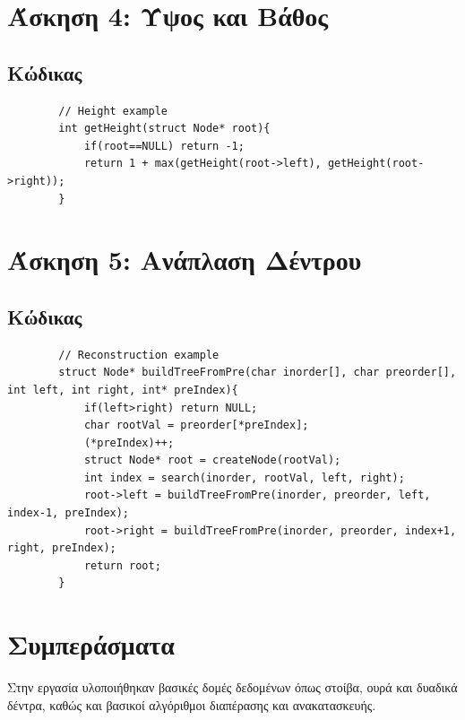 \documentclass[a4paper,12pt]{article}
\begin{document}
	\section{Άσκηση 4: Ύψος και Βάθος}
	
	\subsection{Κώδικας}
	\begin{lstlisting}
		// Height example
		int getHeight(struct Node* root){
			if(root==NULL) return -1;
			return 1 + max(getHeight(root->left), getHeight(root->right));
		}
	\end{lstlisting}
	
	\section{Άσκηση 5: Ανάπλαση Δέντρου}
	
	\subsection{Κώδικας}
	\begin{lstlisting}
		// Reconstruction example
		struct Node* buildTreeFromPre(char inorder[], char preorder[], int left, int right, int* preIndex){
			if(left>right) return NULL;
			char rootVal = preorder[*preIndex];
			(*preIndex)++;
			struct Node* root = createNode(rootVal);
			int index = search(inorder, rootVal, left, right);
			root->left = buildTreeFromPre(inorder, preorder, left, index-1, preIndex);
			root->right = buildTreeFromPre(inorder, preorder, index+1, right, preIndex);
			return root;
		}
	\end{lstlisting}
	\newpage
	\section{Συμπεράσματα}
	Στην εργασία υλοποιήθηκαν βασικές δομές δεδομένων όπως στοίβα, ουρά και δυαδικά δέντρα, καθώς και βασικοί αλγόριθμοι διαπέρασης και ανακατασκευής.
	
\end{document}
